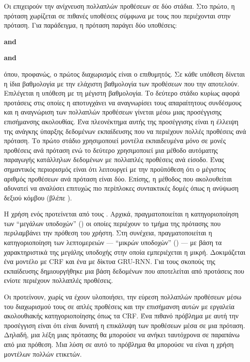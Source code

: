 Οι \citet{kim2017two} επιχειρούν την ανίχνευση πολλαπλών προθέσεων σε δύο στάδια.
Στο πρώτο, η πρόταση χωρίζεται σε πιθανές υποθέσεις σύμφωνα με τους  που περιέχονται στην πρόταση.
Για παράδειγμα, η πρόταση  παράγει δύο υποθέσεις:
\begin{compactenum}
    \item {} \textbf{and} 
    \item {} \textbf{and} 
\end{compactenum}
όπου, προφανώς, ο πρώτος διαχωρισμός είναι ο επιθυμητός.
Σε κάθε υπόθεση δίνεται η ίδια βαθμολογία με την ελάχιστη βαθμολογία των προθέσεων που την αποτελούν.
Επιλέγεται η υπόθεση με τη μέγιστη βαθμολογία.
Το δεύτερο στάδιο κυρίως αφορά προτάσεις στις οποίες
η 
αποτυγχάνει να αναγνωρίσει τους απαραίτητους συνδέσμους και η αναγνώριση των πολλαπλών προθέσεων γίνεται μέσω μιας προσέγγισης επισήμανσης ακολουθίας.
Ένα πλεονέκτημα αυτής της προσέγγισης είναι η έλλειψη της ανάγκης ύπαρξης δεδομένων εκπαίδευσης που να περιέχουν πολλές προθέσεις ανά πρόταση.
Το πρώτο στάδιο χρησιμοποιεί μοντέλα εκπαιδευμένα μόνο σε μονές προθέσεις ανά πρόταση
ενώ το δεύτερο χρησιμοποιεί μια μέθοδο αυτόματης παραγωγής κατάλληλων δεδομένων με πολλαπλές προθέσεις ανά είσοδο.
Ένας σημαντικός περιορισμός είναι ότι λειτουργεί με την προϋπόθεση ότι ο μέγιστος αριθμός προθέσεων ανά πρόταση είναι δύο.
Επίσης, η μέθοδος που ακολουθείται αδυνατεί να αναλύσει επιτυχώς πιο περίπλοκες συντακτικές δομές όπως η ανύψωση δεξιού κόμβου (βλέπε ).

Η χρήση ενός  προτείνεται από τους .
Αρχικά, πραγματοποιείται η κατηγοριοποίηση των \enquote{μεγάλων υποδοχών} () οι οποίες περιέχουν το τμήμα της πρότασης που περιλαμβάνει την πρόθεση του χρήστη.
Στη συνέχεια, πραγματοποιείται η κατηγοριοποίηση των λεπτομερειών --- \enquote{μικρών υποδοχών} () --- με βάση τα χαρακτηριστικά της μεγάλης υποδοχής στην οποία εμπεριέχεται η μικρή.
Δοκιμάζεται ένα μοντέλο με CRF και ένα με δίκτυα GRU-RNN.
Για τους σκοπούς της εκπαίδευσης δημιουργήθηκε μια βάση δεδομένων που αποτελείται από προτάσεις που ενίοτε περιέχουν πολλαπλές προθέσεις.

Οι \citet{xia2018zero} προτείνουν, χωρίς να έχουν υλοποιήσει, την εύρεση πολλαπλών προθέσεων μέσω του διαχωρισμού τους σε απλές προθέσεις και την επισήμανση αυτών με εργαλεία ακολουθιακής κατηγοριοποίησης όπως τα CRF.
Ένα πιθανό πρόβλημα με αυτή την προσέγγιση είναι ότι είναι δυνατή η επικάλυψη των προθέσεων μέσα σε μια πρόταση.
Δηλαδή, μια λέξη μιας πρότασης θα μπορούσε να ανήκει ταυτόχρονα σε παραπάνω από μια πρόθεση.
Μια λύση σε αυτό το πρόβλημα θα μπορούσε να είναι η χρήση μοντέλων πολλών ετικετών.

